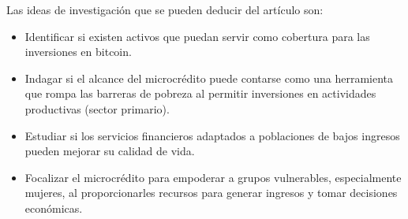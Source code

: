 \documentclass[letterpaper, 12pt]{report}
\begin{document}
Las ideas de investigación que se pueden deducir del artículo son:

\begin{itemize}
      \item Identificar si existen activos que puedan servir como cobertura para las
            inversiones en bitcoin.

      \item Indagar si el alcance del microcrédito puede contarse como una herramienta que
            rompa las barreras de pobreza al permitir inversiones en actividades
            productivas (sector primario).

      \item Estudiar si los servicios financieros adaptados a poblaciones de bajos ingresos
            pueden mejorar su calidad de vida.

      \item Focalizar el microcrédito para empoderar a grupos vulnerables, especialmente
            mujeres, al proporcionarles recursos para generar ingresos y tomar decisiones
            económicas.

\end{itemize}

\printbibliography
\end{document}
